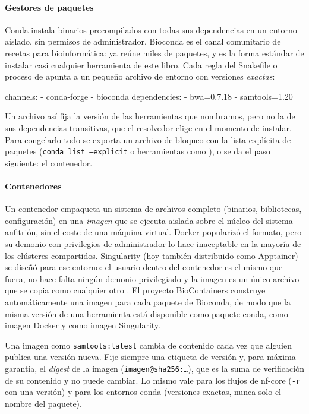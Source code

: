 \paragraph{Gestores de paquetes} Conda instala binarios precompilados con todas sus dependencias en un entorno aislado, sin permisos de administrador. Bioconda \parencite{c18-gruning2018bioconda} es el canal comunitario de recetas para bioinformática: ya reúne miles de paquetes, y es la forma estándar de instalar casi cualquier herramienta de este libro. Cada regla del Snakefile o proceso de  apunta a un pequeño archivo de entorno con versiones \emph{exactas}:

\begin{codigo}
channels:
  - conda-forge
  - bioconda
dependencies:
  - bwa=0.7.18
  - samtools=1.20
\end{codigo}

Un archivo así fija la versión de las herramientas que nombramos, pero no la de sus dependencias transitivas, que el resolvedor elige en el momento de instalar. Para congelarlo todo se exporta un archivo de bloqueo con la lista explícita de paquetes (\texttt{conda list --explicit} o herramientas como ), o se da el paso siguiente: el contenedor.

\paragraph{Contenedores} Un contenedor empaqueta un sistema de archivos completo (binarios, bibliotecas, configuración) en una \emph{imagen} que se ejecuta aislada sobre el núcleo del sistema anfitrión, sin el coste de una máquina virtual. Docker popularizó el formato, pero su demonio con privilegios de administrador lo hace inaceptable en la mayoría de los clústeres compartidos. Singularity (hoy también distribuido como Apptainer) se diseñó para ese entorno: el usuario dentro del contenedor es el mismo que fuera, no hace falta ningún demonio privilegiado y la imagen es un único archivo que se copia como cualquier otro \parencite{c18-kurtzer2017}. El proyecto BioContainers \parencite{c18-daveiga2017} construye automáticamente una imagen para cada paquete de Bioconda, de modo que la misma versión de una herramienta está disponible como paquete conda, como imagen Docker y como imagen Singularity.

\begin{cuidado}
Una imagen como \texttt{samtools:latest} cambia de contenido cada vez que alguien publica una versión nueva. Fije siempre una etiqueta de versión y, para máxima garantía, el \emph{digest} de la imagen (\texttt{imagen@sha256:\ldots}), que es la suma de verificación de su contenido y no puede cambiar. Lo mismo vale para los flujos de nf-core (\texttt{-r} con una versión) y para los entornos conda (versiones exactas, nunca solo el nombre del paquete).
\end{cuidado}

